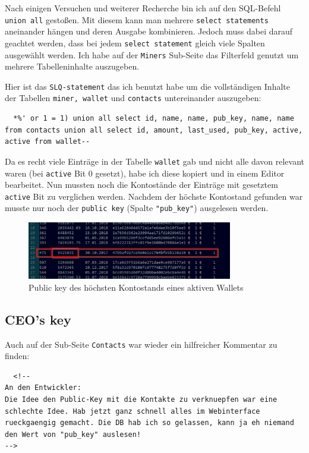 \documentclass[12pt,a4paper,titlepage,oneside]{scrartcl}
\begin{document}
Nach einigen Versuchen und weiterer Recherche bin ich auf den SQL-Befehl \lstinline{union all} gestoßen. Mit diesem kann man mehrere \lstinline{select statements} aneinander hängen und deren Ausgabe kombinieren. Jedoch muss dabei darauf geachtet werden, dass bei jedem \lstinline{select statement} gleich viele Spalten ausgewählt werden. Ich habe auf der \lstinline{Miners} Sub-Seite das Filterfeld genutzt um mehrere Tabelleninhalte auszugeben.

Hier ist das \lstinline{SLQ-statement} das ich benutzt habe um die vollständigen Inhalte der Tabellen \lstinline{miner, wallet} und \lstinline{contacts} untereinander auszugeben:

\begin{lstlisting}
  *%' or 1 = 1) union all select id, name, name, pub_key, name, name from contacts union all select id, amount, last_used, pub_key, active, active from wallet--
\end{lstlisting}

Da es recht viele Einträge in der Tabelle \lstinline{wallet} gab und nicht alle davon relevant waren (bei \lstinline{active} Bit 0 gesetzt), habe ich diese kopiert und in einem Editor bearbeitet. Nun mussten noch die Kontostände der Einträge mit gesetztem \lstinline{active} Bit zu verglichen werden. Nachdem der höchste Kontostand gefunden war musste nur noch der \lstinline{public key} (Spalte \lstinline{"pub_key"}) ausgelesen werden.

\begin{figure}[h!]
  \centering
  \includegraphics[width=0.8\textwidth]{./imgs/manager9000/wallet_pub_key.png}
\caption{Public key des höchsten Kontostands eines aktiven Wallets}
\label{fig:wallet_pub_key}
\end{figure}

\subsection{CEO's key}

Auch auf der Sub-Seite \lstinline{Contacts} war wieder ein hilfreicher Kommentar zu finden:

\begin{lstlisting}
  <!--
An den Entwickler:
Die Idee den Public-Key mit die Kontakte zu verknuepfen war eine schlechte Idee. Hab jetzt ganz schnell alles im Webinterface rueckgaengig gemacht. Die DB hab ich so gelassen, kann ja eh niemand den Wert von "pub_key" auslesen!
-->
\end{lstlisting}
\end{document}
